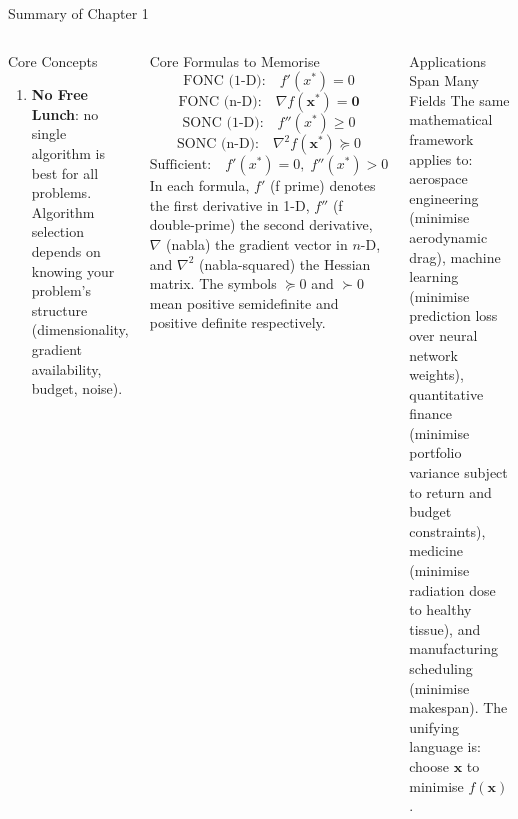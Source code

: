 \documentclass[aspectratio=169,10pt]{beamer}
\newcommand{\vx}{\mathbf{x}}
\newcommand{\grad}{\nabla}
\newcommand{\hess}{\nabla^2}
\begin{document}
\begin{frame}[allowframebreaks]{Summary of Chapter 1}
\begin{columns}[T]
\begin{block}{Core Concepts}
\begin{enumerate}
          \item \textbf{No Free Lunch}: no single algorithm is best for all
            problems.  Algorithm selection depends on knowing your problem's
            structure (dimensionality, gradient availability, budget, noise).
        \end{enumerate}
      \end{block}

      \begin{alertblock}{Core Formulas to Memorise}
        \[
          \text{FONC (1-D):}\quad f'(x^*)=0
        \]
        \[
          \text{FONC (n-D):}\quad \grad f(\vx^*)=\mathbf{0}
        \]
        \[
          \text{SONC (1-D):}\quad f''(x^*)\geq 0
        \]
        \[
          \text{SONC (n-D):}\quad \hess f(\vx^*)\succeq 0
        \]
        \[
          \text{Sufficient:}\quad f'(x^*)=0,\; f''(x^*)>0
        \]
        In each formula, $f'$ (f prime) denotes the first derivative in 1-D,
        $f''$ (f double-prime) the second derivative, $\grad$ (nabla) the
        gradient vector in $n$-D, and $\hess$ (nabla-squared) the Hessian
        matrix.  The symbols $\succeq 0$ and $\succ 0$ mean positive
        semidefinite and positive definite respectively.
      \end{alertblock}

      \vspace{0.4em}

      \begin{block}{Applications Span Many Fields}
        The same mathematical framework applies to:
        aerospace engineering (minimise aerodynamic drag),
        machine learning (minimise prediction loss over neural network weights),
        quantitative finance (minimise portfolio variance subject to return
        and budget constraints),
        medicine (minimise radiation dose to healthy tissue),
        and manufacturing scheduling (minimise makespan).
        The unifying language is: choose $\vx$ to minimise $f(\vx)$.
      \end{block}
  \end{columns}

\end{frame}
\end{document}
